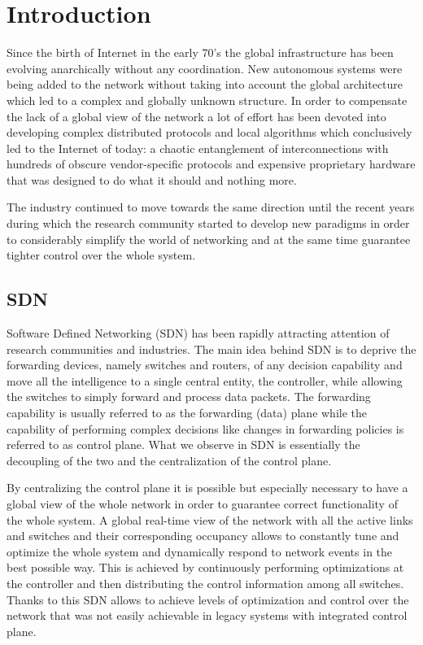 \label{chapter 1}
\ifpdf
\graphicspath{{Chapter1/Figs/}{Chapter1/Figs/PDF/}{Chapter1/Figs/}}
\else
\graphicspath{{Chapter1/Figs/Vector/}{Chapter1/Figs/}}
\fi

\chapter{Introduction}
\label{chap:intro}
Since the birth of Internet in the early 70's the global infrastructure has been evolving anarchically without any coordination. New autonomous systems were being added to the network without taking into account the global architecture which led to a complex and globally unknown structure. In order to compensate the lack of a global view of the network a lot of effort has been devoted into developing complex distributed protocols and local algorithms which conclusively led to the Internet of today: a chaotic entanglement of interconnections with hundreds of obscure vendor-specific protocols and expensive proprietary hardware that was designed to do what it should and nothing more.

The industry continued to move towards the same direction until the recent years during which the research community started to develop new paradigms in order to considerably simplify the world of networking and at the same time guarantee tighter control over the whole system.

\section{SDN}
\label{chap:intro/sdn}
Software Defined Networking (SDN) has been rapidly attracting attention of research communities and industries. The main idea behind SDN is to deprive the forwarding devices, namely switches and routers, of any decision capability and move all the intelligence to a single central entity, the controller, while allowing the switches to simply forward and process data packets. The forwarding capability is usually referred to as the forwarding (data) plane while the capability of performing complex decisions like changes in forwarding policies is referred to as control plane. What we observe in SDN is essentially the decoupling of the two and the centralization of the control plane. 

By centralizing the control plane it is possible but especially necessary to have a global view of the whole network in order to guarantee correct functionality of the whole system. A global real-time view of the network with all the active links and switches and their corresponding occupancy allows to constantly tune and optimize the whole system and dynamically respond to network events in the best possible way. This is achieved by continuously performing optimizations at the controller and then distributing the control information among all switches. Thanks to this SDN allows to achieve levels of optimization and control over the network that was not easily achievable in legacy systems with integrated control plane.

